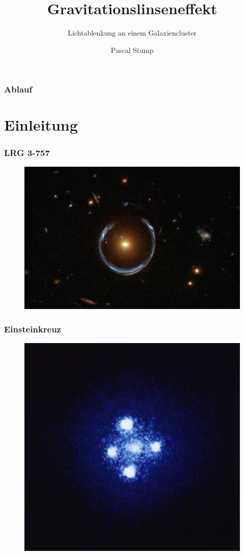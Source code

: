 \documentclass{beamer}
\title{Gravitationslinseneffekt}
\subtitle{Lichtablenkung an einem Galaxiencluster}
\author{Pascal Stump}
\date{\DTMdate{2017-05-29}}
\institute{HSR Mathematisches Seminar 2017}
\begin{document}
\begin{frame}
  \titlepage
\end{frame}

\begin{frame}
  \frametitle{Ablauf}
  \tableofcontents
\end{frame}


\section{Einleitung}

\begin{frame}
  \frametitle{LRG 3-757}
  \begin{figure}
    \includegraphics[width=\textwidth]{../images/LRG_3-757}
  \end{figure}
\end{frame}

\begin{frame}
  \frametitle{Einsteinkreuz}
  \begin{figure}
    \includegraphics[width=.7\textwidth]{../images/Einstein_cross}
  \end{figure}
\end{frame}
\end{document}
